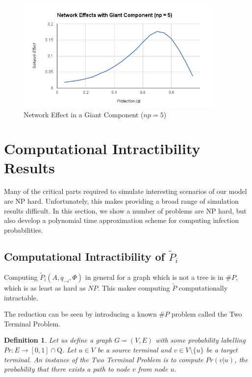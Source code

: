 \documentclass{article}
\theoremstyle{plain}
\newtheorem{definition}{Definition}
\begin{document}
\begin{figure}[h!]
  \centering
  \includegraphics[width=4in]{network_effects_np5.png}
  \caption{Network Effect in a Giant Component ($np = 5$)}
  \label{network_effects_np5.fig}
\end{figure}

\section{Computational Intractibility Results}

Many of the critical parts required to simulate interesting scenarios of our model are NP hard. Unfortunately, this makes providing a broad range of simulation results difficult. In this section, we show a number of problems are NP hard, but also develop a polynomial time approximation scheme for computing infection probabilities.

\subsection{Computational Intractibility of $\tilde{P}_i$}

Computing $\tilde{P}_i(A, q_{-i}, \Phi)$ in general for a graph which is not a tree is in $\# P$, which is as least as hard as $NP$. This makes computing $\tilde{P}$ computationally intractable.

The reduction can be seen by introducing a known $\# P$ problem called the Two Terminal Problem.

\begin{definition}
  Let us define a graph $G = (V, E)$ with some probability labelling $Pr: E \to [0,1] \cap \mathrm{Q}$. Let $u \in V$ be a source terminal and $v \in V \setminus \{u\}$ be a target terminal. An instance of the \emph{Two Terminal Problem} is to compute $Pr(v | u)$, the probability that there exists a path to node $v$ from node $u$.
\end{definition}
\end{document}
